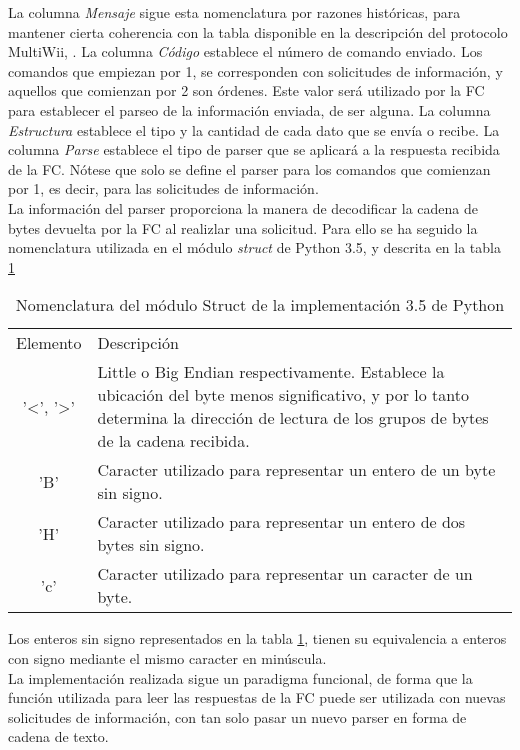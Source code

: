 La columna \textit{Mensaje} sigue esta nomenclatura por razones históricas, para mantener cierta coherencia con la tabla disponible en la descripción del protocolo MultiWii, \citep{wiki:MSPDefinition}. La columna \textit{Código} establece el número de comando enviado. Los comandos que empiezan por 1, se corresponden con solicitudes de información, y aquellos que comienzan por 2 son órdenes. Este valor será utilizado por la FC para establecer el parseo de la información enviada, de ser alguna. La columna \textit{Estructura} establece el tipo y la cantidad de cada dato que se envía o recibe. La columna \textit{Parse} establece el tipo de parser que se aplicará a la respuesta recibida de la FC. Nótese que solo se define el parser para los comandos que comienzan por 1, es decir, para las solicitudes de información.
\\La información del parser proporciona la manera de decodificar la cadena de bytes devuelta por la FC al realizlar una solicitud. Para ello se ha seguido la nomenclatura utilizada en el módulo \textit{struct} de Python 3.5, \citep{wiki:PythonStruct} y  descrita en la tabla \ref{tb:PY35STRUCT}

\begin{table}
	\begin{center}	
		\begin{tabular}{c | p{10cm}}\hline
			\toprule
			Elemento & Descripción\\
			\otoprule
			'<', '>' & Little o Big Endian respectivamente. Establece la ubicación del byte menos significativo, y por lo tanto determina la dirección de lectura de los grupos de bytes de la cadena recibida.\\
			'B' & Caracter utilizado para representar un entero de un byte sin signo.\\
			'H' & Caracter utilizado para representar un entero de dos bytes sin signo.\\
			'c' & Caracter utilizado para representar un caracter de un byte.\\
			\bottomrule
		\end{tabular}
		\caption{Nomenclatura del módulo Struct de la implementación 3.5 de Python}
		\label{tb:PY35STRUCT}
	\end{center}
\end{table} 

Los enteros sin signo representados en la tabla \ref{tb:PY35STRUCT}, tienen su equivalencia a enteros con signo mediante el mismo caracter en minúscula.\\La implementación realizada sigue un paradigma funcional, de forma que la función utilizada para leer las respuestas de la FC puede ser utilizada con nuevas solicitudes de información, con tan solo pasar un nuevo parser en forma de cadena de texto.



